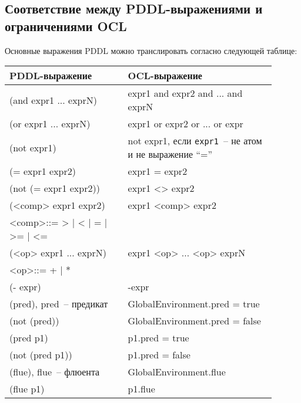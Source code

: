 \subsection{Соответствие между PDDL-выражениями и ограничениями OCL}

Основные выражения PDDL можно транслировать согласно следующей таблице:

{
    \renewcommand{\arraystretch}{1.3}
    \centering
    \ttfamily
    \begin{tabular}{|p{0.40\linewidth}|p{0.50\linewidth}|}
        \hline
        \normalfont\bfseries PDDL\:-выражение & \normalfont\bfseries OCL\:-выражение \\
        \hline
        (and expr1 ... exprN) & expr1 and expr2 and ... and exprN \\
        \hline
        (or expr1 ... exprN) & expr1 or expr2 or ... or expr \\
        \hline
        (not expr1) & not expr1\normalfont, если \texttt{expr1}~-- не атом и не выражение ``='' \\ 
        \hline
        (= expr1 expr2) & expr1 = expr2 \\ \hline
        (not (= expr1 expr2)) & expr1 <> expr2 \\
        \hline 
        (<comp> expr1 expr2) & expr1 <comp> expr2 \\
        {\small <comp>::= > | < | = | >= | <=} & \\
        \hline
        (<op> expr1 ... exprN) & expr1 <op> ... <op> exprN \\
        {\small <op>::= + | *} & \\
        \hline
        (- expr) & -expr \\ 
        \hline
        (pred)\normalfont, pred~-- предикат & GlobalEnvironment.pred = true \\ \hline
        (not (pred)) & GlobalEnvironment.pred = false \\ \hline
        (pred p1) & p1.pred = true \\ \hline
        (not (pred p1)) & p1.pred = false \\
        \hline
        (flue)\normalfont, flue~-- флюента& GlobalEnvironment.flue \\ \hline
        (flue p1) & p1.flue \\
        \hline
    \end{tabular}
}
\\[5pt]



